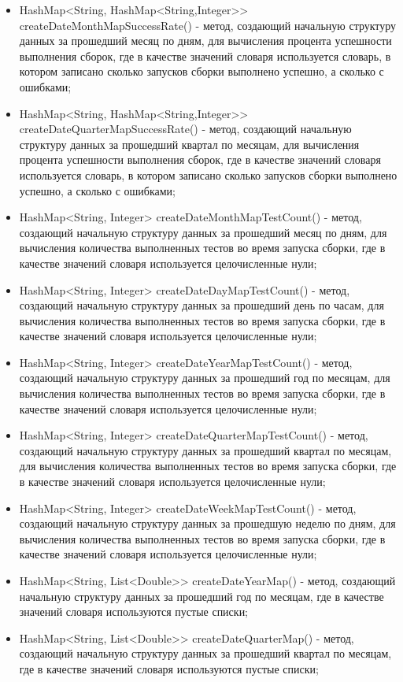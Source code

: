 \begin{itemize}
	\item HashMap<String, HashMap<String,Integer>> createDateMonthMapSuccessRate() - метод, создающий начальную структуру данных за прошедший месяц по дням, для вычисления процента успешности выполнения сборок, где в качестве значений словаря используется словарь, в котором записано сколько запусков сборки выполнено успешно, а сколько с ошибками;
	\item HashMap<String, HashMap<String,Integer>> createDateQuarterMapSuccessRate() - метод, создающий начальную структуру данных за прошедший квартал по месяцам, для вычисления процента успешности выполнения сборок, где в качестве значений словаря используется словарь, в котором записано сколько запусков сборки выполнено успешно, а сколько с ошибками;
	\item HashMap<String, Integer> createDateMonthMapTestCount() - метод, создающий начальную структуру данных за прошедший месяц по дням, для вычисления количества выполненных тестов во время запуска сборки, где в качестве значений словаря используется целочисленные нули;
	\item HashMap<String, Integer> createDateDayMapTestCount() - метод, создающий начальную структуру данных за прошедший день по часам, для вычисления количества выполненных тестов во время запуска сборки, где в качестве значений словаря используется целочисленные нули;
	\item HashMap<String, Integer> createDateYearMapTestCount() - метод, создающий начальную структуру данных за прошедший год по месяцам, для вычисления количества выполненных тестов во время запуска сборки, где в качестве значений словаря используется целочисленные нули;
	\item HashMap<String, Integer> createDateQuarterMapTestCount() - метод, создающий начальную структуру данных за прошедший квартал по месяцам, для вычисления количества выполненных тестов во время запуска сборки, где в качестве значений словаря используется целочисленные нули;
	\item HashMap<String, Integer> createDateWeekMapTestCount() - метод, создающий начальную структуру данных за прошедшую неделю по дням, для вычисления количества выполненных тестов во время запуска сборки, где в качестве значений словаря используется целочисленные нули;
	\item HashMap<String, List<Double>> createDateYearMap() - метод, создающий начальную структуру данных за прошедший год по месяцам, где в качестве значений словаря используются пустые списки;
	\item HashMap<String, List<Double>> createDateQuarterMap() - метод, создающий начальную структуру данных за прошедший квартал по месяцам, где в качестве значений словаря используются пустые списки;

\end{itemize}
